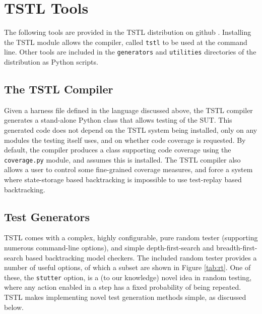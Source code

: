 \section{TSTL Tools}

The following tools are provided in the TSTL distribution on github \cite{tstl}.  Installing the TSTL module allows the compiler, called {\tt tstl} to be used at the command line.  Other tools are included in the {\tt generators} and {\tt utilities} directories of the distribution as Python scripts.

\subsection{The TSTL Compiler}

Given a harness file defined in the language discussed above, the TSTL compiler generates a stand-alone Python class that allows testing of the SUT.  This generated code does not depend on the TSTL system being installed, only on any modules the testing itself uses, and on whether code coverage is requested.  By default, the compiler produces a class supporting code coverage using the {\tt coverage.py} module, and assumes this is installed.  The TSTL compiler also allows a user to control some fine-grained coverage measures, and force a system where state-storage based backtracking is impossible to use test-replay based backtracking.

\subsection{Test Generators}

TSTL comes with a complex, highly configurable, pure random tester (supporting numerous command-line options), and simple depth-first-search and breadth-first-search based backtracking model checkers.  The included random tester provides a number of useful options, of which a subset are shown in Figure \ref{tab:rt}.  One of these, the {\tt stutter} option, is a (to our knowledge) novel idea in random testing, where any action enabled in a step has a fixed probability of being repeated.  TSTL makes implementing novel test generation methods simple, as discussed below.

